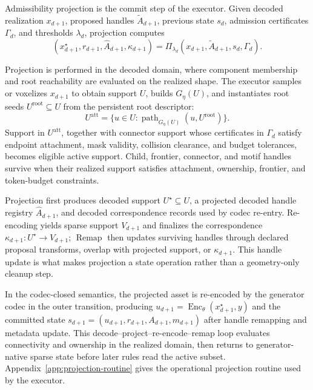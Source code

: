 \documentclass[acmtog,anonymous,review]{acmart}
\begin{document}
Admissibility projection is the commit step of the executor. Given decoded realization $x_{d+1}$, proposed handles $\widetilde A_{d+1}$, previous state $s_d$, admission certificates $\Gamma_d$, and thresholds $\lambda_d$, projection computes
\begin{equation}
(x^\star_{d+1},r_{d+1},\widehat A_{d+1},\kappa_{d+1})
=
\Pi_{\lambda_d}(x_{d+1},\widetilde A_{d+1},s_d,\Gamma_d).
\end{equation}

Projection is performed in the decoded domain, where component membership and root reachability are evaluated on the realized shape. The executor samples or voxelizes $x_{d+1}$ to obtain support $U$, builds $G_\eta(U)$, and instantiates root seeds $U^{\mathrm{root}}\subseteq U$ from the persistent root descriptor:
\begin{equation}
U^{\mathrm{att}}
=
\{u\in U:\operatorname{path}_{G_\eta(U)}(u,U^{\mathrm{root}})\}.
\end{equation}
Support in $U^{\mathrm{att}}$, together with connector support whose certificates in $\Gamma_d$ satisfy endpoint attachment, mask validity, collision clearance, and budget tolerances, becomes eligible active support. Child, frontier, connector, and motif handles survive when their realized support satisfies attachment, ownership, frontier, and token-budget constraints.

Projection first produces decoded support $U^\star\subseteq U$, a projected decoded handle registry $\widehat A_{d+1}$, and decoded correspondence records used by codec re-entry. Re-encoding yields sparse support $V_{d+1}$ and finalizes the correspondence $\kappa_{d+1}:U^\star\rightarrow V_{d+1}$; $\operatorname{Remap}$ then updates surviving handles through declared proposal transforms, overlap with projected support, or $\kappa_{d+1}$. This handle update is what makes projection a state operation rather than a geometry-only cleanup step.

In the codec-closed semantics, the projected asset is re-encoded by the generator codec in the outer transition, producing $u_{d+1}=\operatorname{Enc}_\theta(x^\star_{d+1},y)$ and the committed state $s_{d+1}=(u_{d+1},r_{d+1},A_{d+1},m_{d+1})$ after handle remapping and metadata update. This decode--project--re-encode--remap loop evaluates connectivity and ownership in the realized domain, then returns to generator-native sparse state before later rules read the active subset. Appendix~\ref{app:projection-routine} gives the operational projection routine used by the executor.
\end{document}
